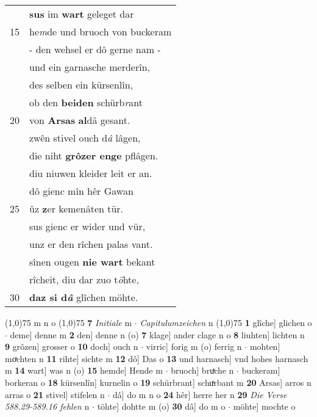\documentclass[8pt,a4paper,notitlepage]{article}
\begin{document}
\begin{table}[ht]
\begin{minipage}[t]{0.5\linewidth}
\begin{tabular}{rl}
 & \textbf{sus} im \textbf{wart} geleget dar\\ 
15 & he\textit{m}de und bruoch von buckeram\\ 
 & - den wehsel er dô gerne nam -\\ 
 & und ein garnasche merderîn,\\ 
 & des selben ein kürsenlîn,\\ 
 & ob den \textbf{beiden} schürb\textit{r}ant\\ 
20 & von \textbf{Arsas} \textbf{al}dâ gesant.\\ 
 & zwên stivel ouch d\textit{â} lâgen,\\ 
 & die niht \textbf{grôzer enge} pflâgen.\\ 
 & diu niuwen kleider leit er an.\\ 
 & dô gienc mîn hêr Gawan\\ 
25 & ûz \textbf{z}er kemenâten tür.\\ 
 & sus gienc er wider und vür,\\ 
 & unz er den rîchen palas vant.\\ 
 & sînen ougen \textbf{nie wart} bekant\\ 
 & rîcheit, diu dar zuo t\textit{ö}hte,\\ 
30 & \textbf{daz si d\textit{â}} glîchen möhte.\\ 
\end{tabular}
\scriptsize
\line(1,0){75} \newline
m n o \newline
\line(1,0){75} \newline
\textbf{7} \textit{Initiale} m   $\cdot$ \textit{Capitulumzeichen} n  \newline
\line(1,0){75} \newline
\textbf{1} glîche] glichen o  $\cdot$ deme] denne m \textbf{2} den] denne n (o) \textbf{7} klage] ander clage n o \textbf{8} liuhten] lichten n \textbf{9} grôzen] grosser o \textbf{10} doch] ouch n  $\cdot$ virric] forig m (o) ferrig n  $\cdot$ mohten] moͯchten n \textbf{11} rihte] sichte m \textbf{12} dô] Das o \textbf{13} und harnasch] vnd hohes harnasch m \textbf{14} wart] was n (o) \textbf{15} hemde] Hende m  $\cdot$ bruoch] bruͯche n  $\cdot$ buckeram] borkeran o \textbf{18} kürsenlîn] kurnelin o \textbf{19} schürbrant] schuͯrbant m \textbf{20} Arsas] arros n arras o \textbf{21} stivel] stifelen n  $\cdot$ dâ] do m n o \textbf{24} hêr] herre her n \textbf{29} \textit{Die Verse 588.29-589.16 fehlen} n   $\cdot$ töhte] dohtte m (o) \textbf{30} dâ] do m o  $\cdot$ möhte] mochte o \newline
\end{minipage}
\end{table}
\end{document}
